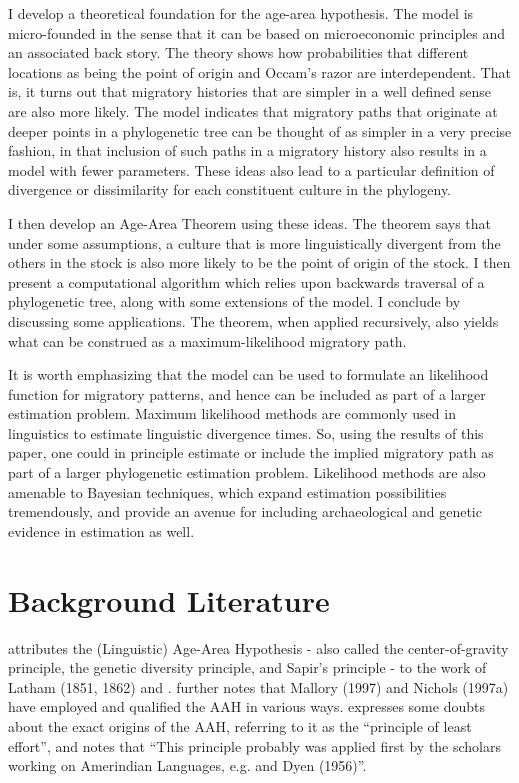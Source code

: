 \documentclass[11pt]{article}
\begin{document}
I develop a theoretical foundation for the age-area hypothesis. The model is micro-founded in the sense that it can be based on microeconomic principles and an associated back story. The theory shows how probabilities that different locations as being the point of origin and Occam's razor are interdependent. That is, it turns out that migratory histories that are simpler in a well defined sense are also more likely. The model indicates that migratory paths that originate at deeper points in a phylogenetic tree can be thought of as simpler in a very precise fashion, in that inclusion of such paths in a migratory history also results in a model with fewer parameters. These ideas also lead to a particular definition of divergence or dissimilarity for each constituent culture in the phylogeny. 

I then develop an Age-Area Theorem using these ideas. The theorem says that under some assumptions, a culture that is more linguistically divergent from the others in the stock is also more likely to be the point of origin of the stock. I then present a computational algorithm which relies upon backwards traversal of a phylogenetic tree, along with some extensions of the model. I conclude by discussing some applications. The theorem, when applied recursively, also yields what can be construed as a maximum-likelihood migratory path. 

It is worth emphasizing that the model can be used to formulate an likelihood function for migratory patterns, and hence can be included as part of a larger estimation problem. Maximum likelihood methods are commonly used in linguistics to estimate linguistic divergence times. So, using the results of this paper, one could in principle estimate or include the implied migratory path as part of a larger phylogenetic estimation problem. Likelihood methods are also amenable to Bayesian techniques, which expand estimation possibilities tremendously, and provide an avenue for including archaeological and genetic evidence in estimation as well. 

\section{Background Literature}

\citet[p.12]{trask00} attributes the (Linguistic) Age-Area Hypothesis - also called the center-of-gravity principle, the genetic diversity principle, and Sapir's principle - to the work of Latham (1851, 1862) and \cite{sapir16}. \cite{trask00} further notes that Mallory (1997) and Nichols (1997a) have employed and qualified the AAH in various ways.   \citet[p.336]{dimmendaal11} expresses some doubts about the exact origins of the AAH, referring to it as the ``principle of least effort'', and notes that ``This principle probably was applied first by the scholars working on Amerindian Languages, e.g. \cite{sapir16} and Dyen (1956)''.
\end{document}
